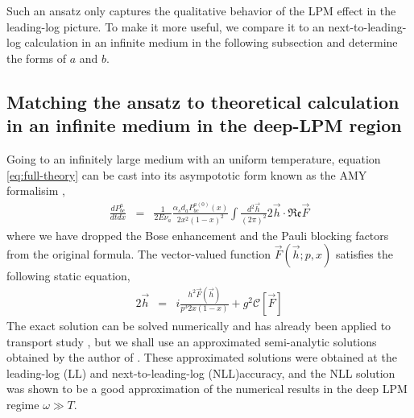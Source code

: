 \documentclass[aps, prc, reprint, amsmath, groupedaddress, nofootinbib]{revtex4-1}
\begin{document}
Such an ansatz only captures the qualitative behavior of the LPM effect in the leading-log picture. 
To make it more useful, we compare it to an next-to-leading-log calculation in an infinite medium in the following subsection and determine the forms of $a$ and $b$.

\subsection{Matching the ansatz to theoretical calculation in an infinite medium in the deep-LPM region}
Going to an infinitely large medium with an uniform temperature, equation \ref{eq:full-theory} can be cast into its asympototic form known as the AMY formalisim \cite{Arnold:2002ja,Arnold:2002zm,Arnold:2003zc},
\begin{eqnarray}\label{eq:AMY-1}
\frac{dP^a_{bc}}{dt dx} &=& \frac{1}{2E\nu_a} \frac{\alpha_s d_a P^{a(0)}_{bc}(x)}{2x^2(1-x)^2}\int\frac{d^2\vec{h}}{(2\pi)^2}2\vec{h}\cdot \mathfrak{Re} \vec{F}
\end{eqnarray}
where we have dropped the Bose enhancement and the Pauli blocking factors from the original formula.
The vector-valued function $\vec{F}(\vec{h}; p, x)$ satisfies the following static equation,
\begin{eqnarray}\label{eq:AMY-2}
2\vec{h} &=& i\frac{h^2 \vec{F}(\vec{h})}{p^3 2x(1-x)} + g^2 \mathcal{C}[\vec{F}]
\end{eqnarray} 
The exact solution can be solved numerically and has already been applied to transport study \cite{Jeon:2003gi,Schenke:2009gb}, but we shall use an approximated semi-analytic solutions obtained by the author of \cite{Arnold:2008zu}.
These approximated solutions were obtained at the leading-log (LL) and next-to-leading-log (NLL)accuracy, and the NLL solution was shown to be a good approximation of the numerical results in the deep LPM regime $\omega \gg T$.
\end{document}
